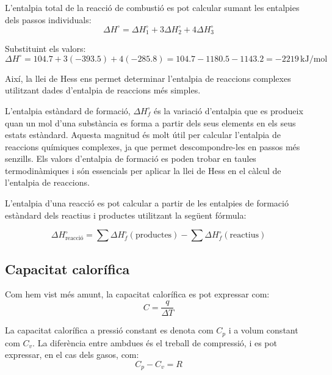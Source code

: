L'entalpia total de la reacció de combustió es pot calcular sumant les entalpies dels passos individuals:
\begin{equation}
\Delta H^\circ = \Delta H_1^\circ + 3 \Delta H_2^\circ + 4 \Delta H_3^\circ
\end{equation}

Substituint els valors:
\begin{equation}
\Delta H^\circ = 104.7 + 3(-393.5) + 4(-285.8) = 104.7 - 1180.5 - 1143.2 = -2219 \, \si{\kilo\joule\per\mole}
\end{equation}

Així, la llei de Hess ens permet determinar l'entalpia de reaccions complexes utilitzant dades d'entalpia de reaccions més simples.

L'entalpia estàndard de formació, $\Delta H_f^\circ$ és la variació d'entalpia que es produeix quan un mol d'una substància es forma a partir dels seus elements en els seus estats estàndard. Aquesta magnitud és molt útil per calcular l'entalpia de reaccions químiques complexes, ja que permet descompondre-les en passos més senzills. Els valors d'entalpia de formació es poden trobar en taules termodinàmiques i són essencials per aplicar la llei de Hess en el càlcul de l'entalpia de reaccions.

L'entalpia d'una reacció es pot calcular a partir de les entalpies de formació estàndard dels reactius i productes utilitzant la següent fórmula:

\begin{equation}
\Delta H^\circ_{\text{reacció}} = \sum \Delta H^\circ_f (\text{productes}) - \sum \Delta H^\circ_f (\text{reactius})
\end{equation}

\subsection{Capacitat calorífica}   

Com hem vist més amunt, la capacitat calorífica es pot expressar com:
\begin{equation}
    C = \frac{q}{\Delta T}
\end{equation}

La capacitat calorífica a pressió constant es denota com $C_p$ i a volum constant com $C_v$. La diferència entre ambdues és el treball de compressió, i es pot expressar, en el cas dels gasos, com:
\begin{equation}
    C_p - C_v = R
\end{equation}

